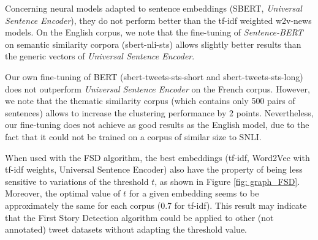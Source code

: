 Concerning neural models adapted to sentence embeddings (SBERT, \textit{Universal Sentence Encoder}), they do not perform better than the tf-idf weighted w2v-news models. On the English corpus, we note that the fine-tuning of \textit{Sentence-BERT} on semantic similarity corpora (sbert-nli-sts) allows slightly better results than the generic vectors of \textit{Universal Sentence Encoder}.

Our own fine-tuning of BERT (sbert-tweets-sts-short and sbert-tweets-sts-long) does not outperform \textit{Universal Sentence Encoder} on the French corpus. However, we note that the thematic similarity corpus (which contains only 500 pairs of sentences) allows to increase the clustering performance by 2 points. Nevertheless, our fine-tuning does not achieve as good results as the English model, due to the fact that it could not be trained on a corpus of similar size to SNLI.

When used with the FSD algorithm, the 
best embeddings (tf-idf, Word2Vec with tf-idf weights,
Universal Sentence Encoder) also have the property of being
less sensitive to variations of the threshold $t$, as shown in
Figure \ref{fig: graph_FSD}. Moreover, the optimal value of $t$ for a
given embedding seems to be approximately the same for
each corpus (0.7 for tf-idf). This result may indicate that
the First Story Detection algorithm could be applied to
other (not annotated) tweet datasets without adapting the
threshold value.

